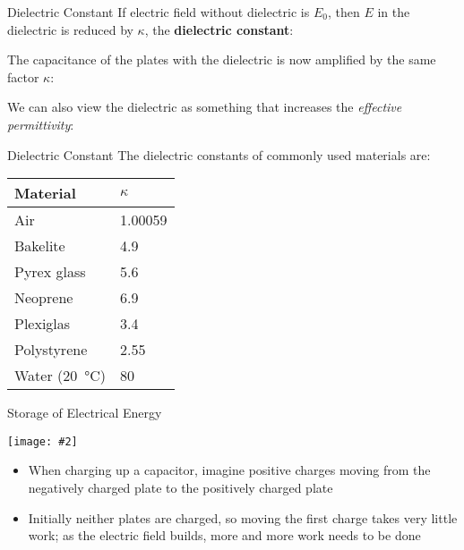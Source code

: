 \documentclass[12pt,aspectratio=169]{beamer}
\newcommand{\pic}[2]{\texttt{[image: \#2]}}
\newcommand{\eq}[2]{\vspace{#1}{\Large\begin{displaymath}#2\end{displaymath}}}
\begin{document}
\begin{frame}{Dielectric Constant}
  If electric field without dielectric is $E_0$, then $E$ in the dielectric is
  reduced by $\kappa$, the \textbf{dielectric constant}:

  \eq{-.25in}{
    \boxed{\kappa=\frac{E_0}{E}}
  }

  The capacitance of the plates with the dielectric is now amplified by the
  same factor $\kappa$:

  \eq{-.3in}{
    \boxed{C=\kappa C_0}
  }

  We can also view the dielectric as something that increases the
  \emph{effective permittivity}:
  
  \eq{-.3in}{
    \boxed{\epsilon=\kappa\epsilon_0}
  }
\end{frame}



\begin{frame}{Dielectric Constant}
  The dielectric constants of commonly used materials are:
  \begin{center}
    \begin{tabular}{l|l}
      \rowcolor{pink}
      \textbf{Material} & $\kappa$ \\ \hline
      Air         & \num{1.00059} \\
      Bakelite    & \num{4.9} \\
      Pyrex glass & \num{5.6} \\
      Neoprene    & \num{6.9} \\
      Plexiglas  & \num{3.4} \\
      Polystyrene & \num{2.55} \\
      Water (\SI{20}{\celsius}) & \num{80} 
    \end{tabular}
  \end{center}
\end{frame}


\begin{frame}{Storage of Electrical Energy}
  \begin{center}
    \pic{.45}{slide14.png}
  \end{center}
  \begin{itemize}
  \item When charging up a capacitor, imagine positive charges moving from the
    negatively charged plate to the positively charged plate
  \item Initially neither plates are charged, so moving the first charge takes
    very little work; as the electric field builds, more and more work needs
    to be done
  \end{itemize}
\end{frame}
\end{document}
